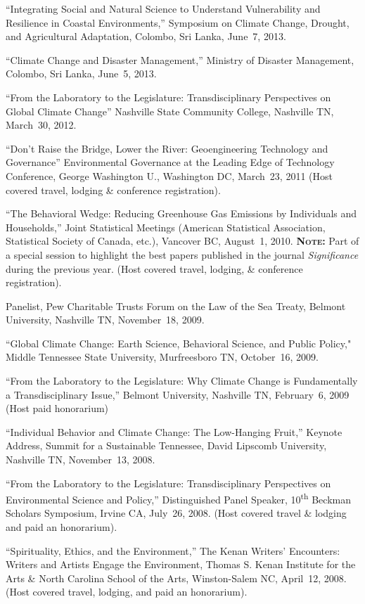 %
%
\item ``Integrating Social and Natural Science to Understand Vulnerability and Resilience in Coastal Environments,'' Symposium on Climate Change, Drought, and Agricultural Adaptation, Colombo, Sri Lanka, June~7, 2013.
\item ``Climate Change and Disaster Management,'' Ministry of Disaster Management, Colombo, Sri Lanka, June~5, 2013.
\item ``From the Laboratory to the Legislature: Transdisciplinary Perspectives on Global Climate Change'' Nashville State Community College, Nashville TN, March~30, 2012.
\item ``Don't Raise the Bridge, Lower the River: Geoengineering Technology and Governance'' Environmental Governance at the Leading Edge of Technology Conference, George Washington U., Washington DC, March~23, 2011 (Host covered travel, lodging \& conference registration).
\item ``The Behavioral Wedge: Reducing Greenhouse Gas Emissions by Individuals and Households,'' Joint Statistical Meetings (American Statistical Association, Statistical Society of Canada, etc.), Vancover BC, August~1, 2010. {\bfseries\scshape Note:} Part of a special session to highlight the best papers published in the journal \textit{Significance\/} during the previous year. (Host covered travel, lodging, \& conference registration).
\item Panelist, Pew Charitable Trusts Forum on the Law of the Sea Treaty, Belmont University, Nashville TN, November~18, 2009.
\item ``Global Climate Change: Earth Science, Behavioral Science, and Public Policy," Middle Tennessee State University, Murfreesboro TN, October~16, 2009.
\item ``From the Laboratory to the Legislature: Why Climate Change is Fundamentally a Transdisciplinary Issue,'' Belmont University, Nashville TN, February~6, 2009 (Host paid honorarium)
\item ``Individual Behavior and Climate Change: The Low-Hanging Fruit,'' Keynote Address, Summit for a Sustainable Tennessee, David Lipscomb University, Nashville TN, November~13, 2008.
\item ``From the Laboratory to the Legislature: Transdisciplinary Perspectives on Environmental Science and Policy,'' Distinguished Panel Speaker, 10\textsuperscript{th} Beckman Scholars Symposium, Irvine CA, July~26, 2008. (Host covered travel \& lodging and paid an honorarium).
\item ``Spirituality, Ethics, and the Environment,'' The Kenan Writers' Encounters: Writers and Artists Engage the Environment, Thomas S. Kenan Institute for the Arts \& North Carolina School of the Arts, Winston-Salem NC, April~12, 2008. (Host covered travel, lodging, and paid an honorarium).
